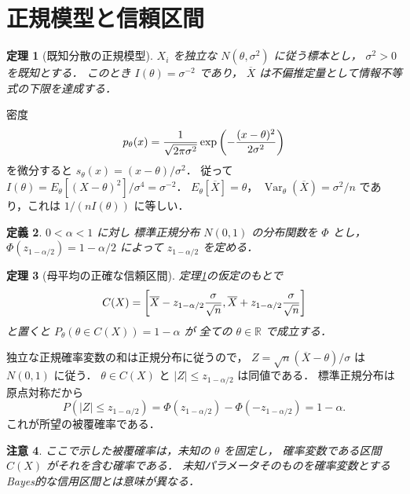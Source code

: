 \documentclass[a5paper,10pt,onecolumn]{jsarticle}
\makeatletter
\theoremstyle{mathnotetheorem}
\newtheorem{theorem}{定理}[section]
\newtheorem{definition}[theorem]{定義}
\newtheorem{remark}[theorem]{注意}
\renewcommand{\proofname}{証明}
\renewenvironment{proof}[1][\proofname]{%
  \par\pushQED{\qed}\normalfont\topsep4\p@\@plus2\p@\relax
  \trivlist\item[\hskip\labelsep\bfseries #1]\ignorespaces
}{\popQED\endtrivlist\@endpefalse}
\makeatother
\begin{document}
\section{正規模型と信頼区間}
\begin{theorem}[既知分散の正規模型]\label{thm:normal}
$X_i$ を独立な $N(\theta,\sigma^2)$ に従う標本とし，
$\sigma^2>0$ を既知とする．
このとき $I(\theta)=\sigma^{-2}$ であり，
$\overline X$ は不偏推定量として情報不等式の下限を達成する．
\end{theorem}
\begin{proof}
密度
\[
 p_\theta(x)={1\over\sqrt{2\pi\sigma^2}}
 \exp\left(-{(x-\theta)^2\over2\sigma^2}\right)
\]
を微分すると $s_\theta(x)=(x-\theta)/\sigma^2$．
従って
$I(\theta)=E_\theta[(X-\theta)^2]/\sigma^4=\sigma^{-2}$．
$E_\theta[\overline X]=\theta$，
$\operatorname{Var}_\theta(\overline X)=\sigma^2/n$
であり，これは $1/(nI(\theta))$ に等しい．
\end{proof}
\begin{definition}
$0<\alpha<1$ に対し
標準正規分布 $N(0,1)$ の分布関数を $\Phi$ とし，
$\Phi(z_{1-\alpha/2})=1-\alpha/2$ によって
$z_{1-\alpha/2}$ を定める．
\end{definition}
\begin{theorem}[母平均の正確な信頼区間]
定理\ref{thm:normal}の仮定のもとで
\[
 C(X)=\left[
 \overline X-z_{1-\alpha/2}{\sigma\over\sqrt n},
 \overline X+z_{1-\alpha/2}{\sigma\over\sqrt n}
 \right]
\]
と置くと
$P_\theta(\theta\in C(X))=1-\alpha$ が
全ての $\theta\in\mathbb R$ で成立する．
\end{theorem}
\begin{proof}
独立な正規確率変数の和は正規分布に従うので，
$Z=\sqrt n(\overline X-\theta)/\sigma$ は
$N(0,1)$ に従う．
$\theta\in C(X)$ と $|Z|\le z_{1-\alpha/2}$ は同値である．
標準正規分布は原点対称だから
\[
 P(|Z|\le z_{1-\alpha/2})
 =\Phi(z_{1-\alpha/2})-\Phi(-z_{1-\alpha/2})
 =1-\alpha.
\]
これが所望の被覆確率である．
\end{proof}
\begin{remark}
ここで示した被覆確率は，未知の $\theta$ を固定し，
確率変数である区間 $C(X)$ がそれを含む確率である．
未知パラメータそのものを確率変数とする
Bayes的な信用区間とは意味が異なる．
\end{remark}
\end{document}
